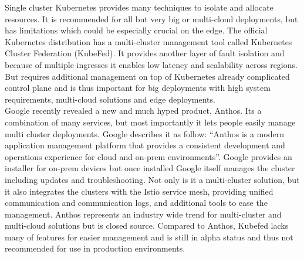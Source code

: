 Single cluster Kubernetes provides many techniques to isolate and allocate resources. It is recommended for all but very big or multi-cloud deployments, but has limitations which could be especially crucial on the edge. The official Kubernetes distribution has a multi-cluster management tool called Kubernetes Cluster Federation (KubeFed)\cite{kubernetesFederation97:online}. It provides another layer of fault isolation and because of multiple ingresses it enables low latency and scalability across regions. But requires additional management on top of Kubernetes already complicated control plane and is thus important for big deployments with high system requirements, multi-cloud solutions and edge deployments.\\
Google recently revealed a new and much hyped product, Anthos\cite{TechnicalAnthosGoogle66:online}. Its a combination of many services, but most importantly it lets people easily manage multi cluster deployments. Google describes it as follow: ``Anthos is a modern application management platform that provides a consistent development and operations experience for cloud and on-prem environments''\cite{TechnicalAnthosGoogle66:online}. Google provides an installer for on-prem devices but once installed Google itself manages the cluster including updates and troubleshooting. Not only is it a multi-cluster solution, but it also integrates the clusters with the Istio service mesh, providing unified communication and communication logs, and additional tools to ease the management. Anthos represents an industry wide trend for multi-cluster and multi-cloud solutions but is closed source. Compared to Anthos, Kubefed lacks many of features for easier management and is still in alpha status and thus not recommended for use in production environments.\\





